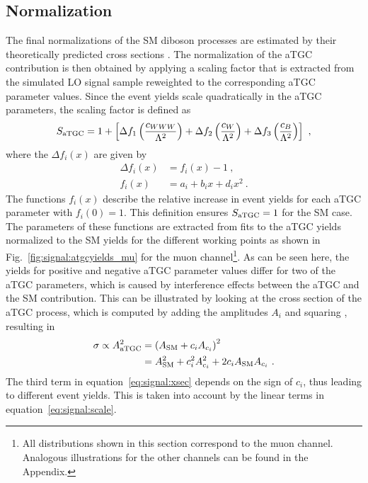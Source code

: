 \subsection*{Normalization}
The final normalizations of the SM diboson processes are estimated by their theoretically predicted cross sections \cite{WWxsec,WZxsec}. The normalization of the aTGC contribution is then obtained by applying a scaling factor that is extracted from the simulated LO signal sample reweighted to the corresponding aTGC parameter values. Since the event yields scale quadratically in the aTGC parameters, the scaling factor is defined as
\begin{equation}
S_{\rm aTGC} = 1 + \left[ \Delta f_1\left(\frac{c_{WWW}}{\Lambda^2}\right) + \Delta f_2\left(\frac{c_{W}}{\Lambda^2}\right) + \Delta f_3\left(\frac{c_{B}}{\Lambda^2}\right) \right] ~,
\end{equation}
where the $\Delta f_i(x)$ are given by
\begin{align}
\Delta f_i(x) &= f_i(x)-1 ~, \\
f_i(x) &= a_i + b_i x + d_i x^2 ~. \label{eq:signal:scale}
\end{align}
The functions $f_i(x)$ describe the relative increase in event yields for each aTGC parameter with $f_i(0)=1$. This definition ensures $S_{\rm aTGC}=1$ for the SM case. The parameters of these functions are extracted from fits to the aTGC yields normalized to the SM yields for the different working points as shown in Fig.~\ref{fig:signal:atgcyields_mu} for the muon channel\footnote{All distributions shown in this section correspond to the muon channel. Analogous illustrations for the other channels can be found in the Appendix.}. As can be seen here, the yields for positive and negative aTGC parameter values differ for two of the aTGC parameters, which is caused by interference effects between the aTGC and the SM contribution. This can be illustrated by looking at the cross section of the aTGC process, which is computed by adding the amplitudes $A_i$ and squaring \cite{EFT}, resulting in
\begin{align}
\sigma \propto A_{\rm aTGC}^2 &= \left( A_{\rm SM} + c_i A_{c_i} \right)^2 \\
&= A_{\rm SM}^2 + c_i^2  A_{c_i}^2 + 2c_i  A_{\rm SM} A_{c_i} ~. \label{eq:signal:xsec} 
\end{align}
The third term in equation~\ref{eq:signal:xsec} depends on the sign of $c_i$, thus leading to different event yields. This is taken into account by the linear terms in equation~\ref{eq:signal:scale}.
